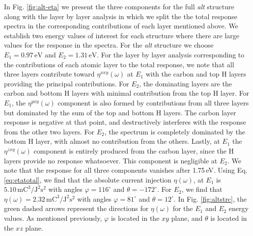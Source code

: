 \documentclass[pss]{wiley2sp} %
\begin{document}
In Fig. \ref{fig:alt-eta} we present the three components for the full
\emph{alt} structure along with the layer by layer analysis in which we split the the total response spectra in the corresponding contributions of each layer mentioned above. We establish two
energy values of interest for each structure where there are large values for the response
in the spectra. For the \emph{alt} structure we choose $E_{1} =
0.97\,\mathrm{eV}$ and $E_{2} = 1.31\,\mathrm{eV}$. For the layer by layer
analysis corresponding to the contributions of each atomic layer to the total response, we note that all three layers contribute toward $\eta^{xxy}(\omega)$
at $E_{1}$ with the carbon and top H layers providing the principal
contributions. For $E_{2}$, the dominating layers are the carbon and bottom H
layers with minimal contribution from the top H layer. For $E_{1}$, the
$\eta^{yxy}(\omega)$ component is also formed by contributions from all three
layers but dominated by the sum of the top and bottom H layers. The carbon
layer response is negative at that point, and destructively interferes with
the response from the other two layers. For $E_{2}$, the spectrum is
completely dominated by the bottom H layer, with almost no contribution from
the others. Lastly, at $E_{1}$ the $\eta^{zxy}(\omega)$ component is entirely
produced from the carbon layer, since the H layers provide no response
whatsoever. This component is negligible at $E_{2}$. We note that the response
for all three components vanishes after 1.75\,eV.
Using Eq. \eqref{eq:etatotal}, we find that the absolute current injection
$\eta(\omega)$, at $E_{1}$ is
$5.10\,\mathrm{mC}^{3}/\mathrm{J}^{2}\mathrm{s}^{2}$ with angles
$\varphi=116^{\circ}$ and $\theta=-172^{\circ}$. For $E_{2}$, we find that
$\eta(\omega)=2.32\,\mathrm{mC}^{3}/\mathrm{J}^{2}\mathrm{s}^{2}$ with angles
$\varphi=81^{\circ}$ and $\theta=12^{\circ}$. In Fig.
\ref{fig:altstrc}, the green dashed arrows represent the directions for
$\eta(\omega)$ for the $E_{1}$ and $E_{2}$ energy values. As mentioned
previously, $\varphi$ is located in the $xy$ plane, and $\theta$ is located in
the $xz$ plane.
\end{document}
